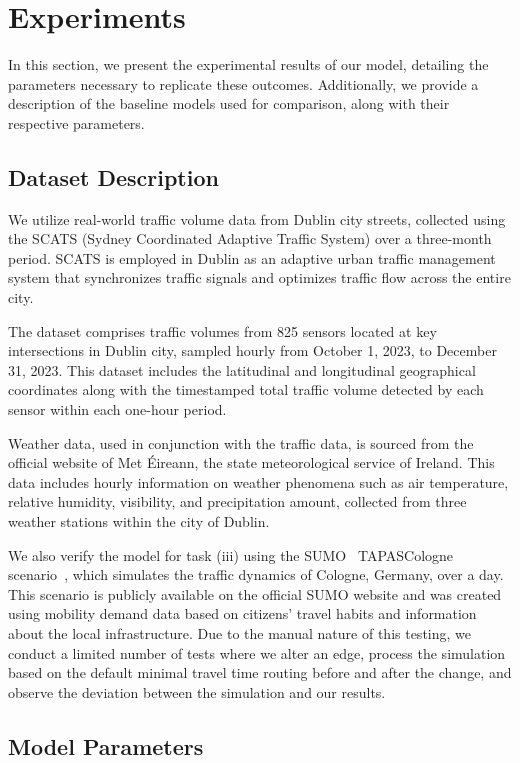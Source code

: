 \section{Experiments}\label{sec:experiments}
In this section, we present the experimental results of our model, detailing the parameters necessary to replicate these outcomes. Additionally, we provide a description of the baseline models used for comparison, along with their respective parameters.

\subsection{Dataset Description}

We utilize real-world traffic volume data from Dublin city streets, collected using the SCATS (Sydney Coordinated Adaptive Traffic System) over a three-month period. SCATS is employed in Dublin as an adaptive urban traffic management system that synchronizes traffic signals and optimizes traffic flow across the entire city.

The dataset comprises traffic volumes from 825 sensors located at key intersections in Dublin city, sampled hourly from October 1, 2023, to December 31, 2023. This dataset includes the latitudinal and longitudinal geographical coordinates along with the timestamped total traffic volume detected by each sensor within each one-hour period.

Weather data, used in conjunction with the traffic data, is sourced from the official website of Met Éireann, the state meteorological service of Ireland. This data includes hourly information on weather phenomena such as air temperature, relative humidity, visibility, and precipitation amount, collected from three weather stations within the city of Dublin.

We also verify the model for task (iii) using the SUMO~\cite{sumo} TAPASCologne scenario~\cite{tapas}, which simulates the traffic dynamics of Cologne, Germany, over a day. This scenario is publicly available on the official SUMO website and was created using mobility demand data based on citizens' travel habits and information about the local infrastructure. Due to the manual nature of this testing, we conduct a limited number of tests where we alter an edge, process the simulation based on the default minimal travel time routing before and after the change, and observe the deviation between the simulation and our results.

\subsection{Model Parameters}

